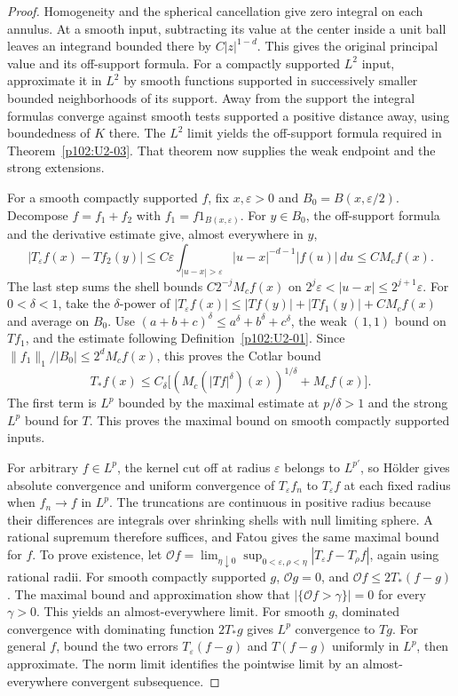 \documentclass[11pt,oneside,openany]{book}
\theoremstyle{definition}
\theoremstyle{remark}
\begin{document}
\begin{proof}
Homogeneity and the spherical cancellation give zero integral on each annulus. At a smooth input, subtracting its value at the center inside a unit ball leaves an integrand bounded there by \(C|z|^{1-d}\). This gives the original principal value and its off-support formula. For a compactly supported \(L^2\) input, approximate it in \(L^2\) by smooth functions supported in successively smaller bounded neighborhoods of its support. Away from the support the integral formulas converge against smooth tests supported a positive distance away, using boundedness of \(K\) there. The \(L^2\) limit yields the off-support formula required in Theorem~\ref{p102:U2-03}. That theorem now supplies the weak endpoint and the strong extensions.

For a smooth compactly supported \(f\), fix \(x,\varepsilon>0\) and \(B_0=B(x,\varepsilon/2)\). Decompose \(f=f_1+f_2\) with \(f_1=f1_{B(x,\varepsilon)}\). For \(y\in B_0\), the off-support formula and the derivative estimate give, almost everywhere in \(y\),
\[
 |T_\varepsilon f(x)-Tf_2(y)|
 \le C\varepsilon\int_{|u-x|>\varepsilon}|u-x|^{-d-1}|f(u)|\,du
 \le C M_cf(x).
\]
The last step sums the shell bounds \(C2^{-j}M_cf(x)\) on \(2^j\varepsilon<|u-x|\le2^{j+1}\varepsilon\). For \(0<\delta<1\), take the \(\delta\)-power of
\(|T_\varepsilon f(x)|\le |Tf(y)|+|Tf_1(y)|+CM_cf(x)\) and average on \(B_0\). Use \((a+b+c)^\delta\le a^\delta+b^\delta+c^\delta\), the weak \((1,1)\) bound on \(Tf_1\), and the estimate following Definition~\ref{p102:U2-01}. Since \(\|f_1\|_1/|B_0|\le 2^dM_cf(x)\), this proves the Cotlar bound
\[
 T_*f(x)\le C_\delta\bigl[(M_c(|Tf|^\delta)(x))^{1/\delta}+M_cf(x)\bigr].
\]
The first term is \(L^p\) bounded by the maximal estimate at \(p/\delta>1\) and the strong \(L^p\) bound for \(T\). This proves the maximal bound on smooth compactly supported inputs.

For arbitrary \(f\in L^p\), the kernel cut off at radius \(\varepsilon\) belongs to \(L^{p'}\), so Hölder gives absolute convergence and uniform convergence of \(T_\varepsilon f_n\) to \(T_\varepsilon f\) at each fixed radius when \(f_n\to f\) in \(L^p\). The truncations are continuous in positive radius because their differences are integrals over shrinking shells with null limiting sphere. A rational supremum therefore suffices, and Fatou gives the same maximal bound for \(f\). To prove existence, let
\(\mathcal O f=\lim_{\eta\downarrow0}\sup_{0<\varepsilon,\rho<\eta}|T_\varepsilon f-T_\rho f|\), again using rational radii. For smooth compactly supported \(g\), \(\mathcal O g=0\), and \(\mathcal O f\le2T_*(f-g)\). The maximal bound and approximation show that \(|\{\mathcal O f>\gamma\}|=0\) for every \(\gamma>0\). This yields an almost-everywhere limit. For smooth \(g\), dominated convergence with dominating function \(2T_*g\) gives \(L^p\) convergence to \(Tg\). For general \(f\), bound the two errors \(T_\varepsilon(f-g)\) and \(T(f-g)\) uniformly in \(L^p\), then approximate. The norm limit identifies the pointwise limit by an almost-everywhere convergent subsequence.
\end{proof}
\end{document}

